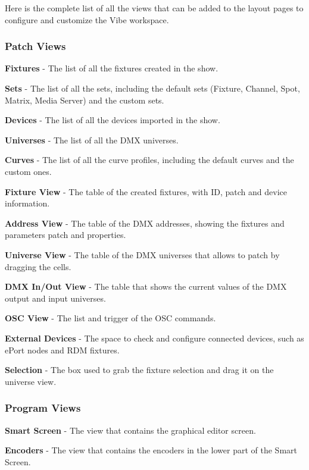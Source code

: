 \documentclass[
]{article}
\begin{document}
Here is the complete list of all the views that can be added to the layout pages to configure and customize the Vibe workspace.

\hypertarget{patch-views}{%
\subsubsection{Patch Views}\label{patch-views}}

\textbf{Fixtures} - The list of all the fixtures created in the show.

\textbf{Sets} - The list of all the sets, including the default sets (Fixture, Channel, Spot, Matrix, Media Server) and the custom sets.

\textbf{Devices} - The list of all the devices imported in the show.

\textbf{Universes} - The list of all the DMX universes.

\textbf{Curves} - The list of all the curve profiles, including the default curves and the custom ones.

\textbf{Fixture View} - The table of the created fixtures, with ID, patch and device information.

\textbf{Address View} - The table of the DMX addresses, showing the fixtures and parameters patch and properties.

\textbf{Universe View} - The table of the DMX universes that allows to patch by dragging the cells.

\textbf{DMX In/Out View} - The table that shows the current values of the DMX output and input universes.

\textbf{OSC View} - The list and trigger of the OSC commands.

\textbf{External Devices} - The space to check and configure connected devices, such as ePort nodes and RDM fixtures.

\textbf{Selection} - The box used to grab the fixture selection and drag it on the universe view.

\hypertarget{program-views}{%
\subsubsection{Program Views}\label{program-views}}

\textbf{Smart Screen} - The view that contains the graphical editor screen.

\textbf{Encoders} - The view that contains the encoders in the lower part of the Smart Screen.
\end{document}
